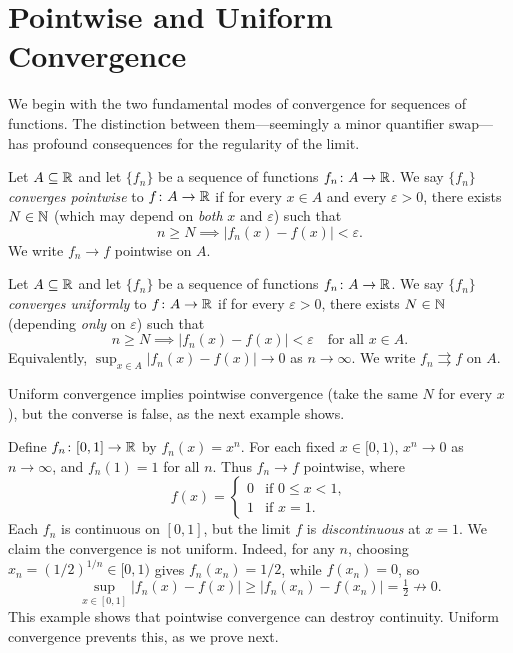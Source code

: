 \documentclass[11pt,a4paper]{article}
\begin{document}
\section{Pointwise and Uniform Convergence}
\label{sec:pointwise_uniform}

We begin with the two fundamental modes of convergence for sequences of
functions. The distinction between them---seemingly a minor quantifier
swap---has profound consequences for the regularity of the limit.

\begin{definition}
\label{def:pointwise}
Let $A \subseteq \mathbb{R}$ and let $\{f_n\}$ be a sequence of functions
$f_n \colon A \to \mathbb{R}$. We say $\{f_n\}$ \emph{converges pointwise} to
$f \colon A \to \mathbb{R}$ if for every $x \in A$ and every $\varepsilon > 0$,
there exists $N \in \mathbb{N}$ (which may depend on \emph{both} $x$ and
$\varepsilon$) such that
\[
  n \ge N \implies |f_n(x) - f(x)| < \varepsilon.
\]
We write $f_n \to f$ pointwise on $A$.
\end{definition}

\begin{definition}
\label{def:uniform}
Let $A \subseteq \mathbb{R}$ and let $\{f_n\}$ be a sequence of functions
$f_n \colon A \to \mathbb{R}$. We say $\{f_n\}$ \emph{converges uniformly} to
$f \colon A \to \mathbb{R}$ if for every $\varepsilon > 0$, there exists
$N \in \mathbb{N}$ (depending \emph{only} on $\varepsilon$) such that
\[
  n \ge N \implies |f_n(x) - f(x)| < \varepsilon
  \quad \text{for all } x \in A.
\]
Equivalently, $\sup_{x \in A} |f_n(x) - f(x)| \to 0$ as
$n \to \infty$. We write $f_n \rightrightarrows f$ on $A$.
\end{definition}

\begin{remark}
\label{rem:uniform_implies_pointwise}
Uniform convergence implies pointwise convergence (take the same $N$
for every $x$), but the converse is false, as the next example shows.
\end{remark}

\begin{example}
\label{ex:x_n}
Define $f_n \colon [0, 1] \to \mathbb{R}$ by $f_n(x) = x^n$. For each fixed
$x \in [0, 1)$, $x^n \to 0$ as $n \to \infty$, and $f_n(1) = 1$ for
all $n$. Thus $f_n \to f$ pointwise, where
\[
  f(x) = \begin{cases} 0 & \text{if } 0 \le x < 1, \\ 1 & \text{if } x = 1. \end{cases}
\]
Each $f_n$ is continuous on $[0, 1]$, but the limit $f$ is
\emph{discontinuous} at $x = 1$. We claim the convergence is not
uniform. Indeed, for any $n$, choosing $x_n = (1/2)^{1/n} \in [0, 1)$
gives $f_n(x_n) = 1/2$, while $f(x_n) = 0$, so
\[
  \sup_{x \in [0,1]} |f_n(x) - f(x)| \ge |f_n(x_n) - f(x_n)|
  = \tfrac{1}{2} \not\to 0.
\]
This example shows that pointwise convergence can destroy continuity.
Uniform convergence prevents this, as we prove next.
\end{example}
\end{document}
